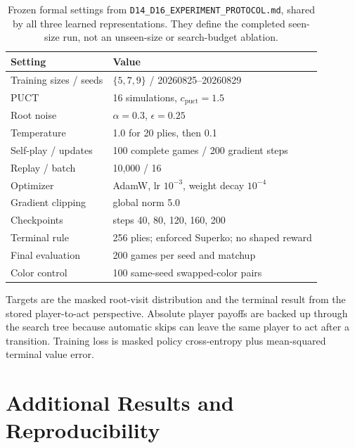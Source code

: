 \documentclass[10pt,letterpaper]{article}
\begin{document}
\begin{table}[H]
  \centering
  \small
  \caption{Frozen formal settings from
  \texttt{D14\_D16\_EXPERIMENT\_PROTOCOL.md}, shared by all three learned
  representations. They define the completed seen-size run, not an unseen-size
  or search-budget ablation.}
  \label{tab:hyperparameters}
  \begin{tabular}{ll}
    \toprule
    Setting & Value \\
    \midrule
    Training sizes / seeds & $\{5,7,9\}$ / 20260825--20260829 \\
    PUCT & 16 simulations, $c_{\mathrm{puct}}=1.5$ \\
    Root noise & $\alpha=0.3$, $\epsilon=0.25$ \\
    Temperature & 1.0 for 20 plies, then 0.1 \\
    Self-play / updates & 100 complete games / 200 gradient steps \\
    Replay / batch & 10,000 / 16 \\
    Optimizer & AdamW, lr $10^{-3}$, weight decay $10^{-4}$ \\
    Gradient clipping & global norm 5.0 \\
    Checkpoints & steps 40, 80, 120, 160, 200 \\
    Terminal rule & 256 plies; enforced Superko; no shaped reward \\
    Final evaluation & 200 games per seed and matchup \\
    Color control & 100 same-seed swapped-color pairs \\
    \bottomrule
  \end{tabular}
\end{table}

Targets are the masked root-visit distribution and the terminal result from the
stored player-to-act perspective. Absolute player payoffs are backed up through
the search tree because automatic skips can leave the same player to act after
a transition. Training loss is masked policy cross-entropy plus mean-squared
terminal value error.

\section{Additional Results and Reproducibility}
\label{app:reproducibility}
\end{document}
